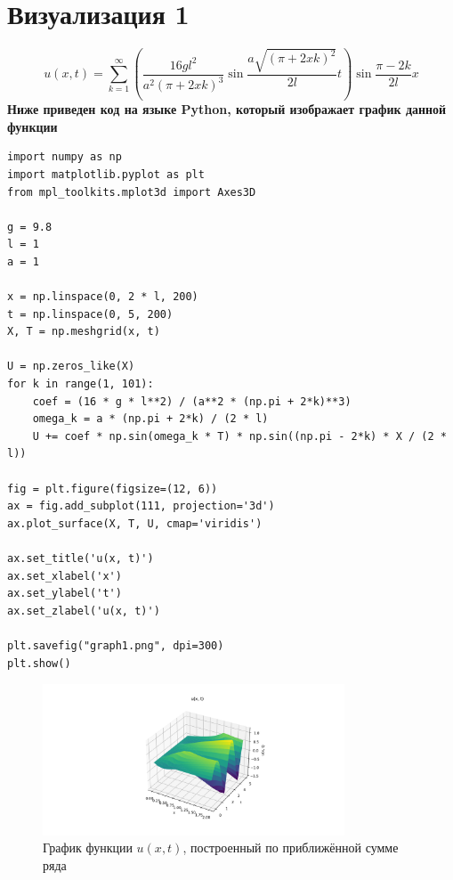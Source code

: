 \documentclass[a4paper,12pt]{article}
\begin{document}
\section{Визуализация 1}
$$u(x,t) = \sum_{k=1}^\infty \left( \frac{16 g l^2}{a^2 (\pi + 2 x k)^3} \sin \frac{a \sqrt{(\pi + 2 x k)^2}}{2 l} t \right) \sin \frac{\pi - 2 k}{2 l} x$$
\textbf{Ниже приведен код на языке Python, который изображает график данной функции}
\begin{lstlisting}
import numpy as np
import matplotlib.pyplot as plt
from mpl_toolkits.mplot3d import Axes3D

g = 9.8
l = 1
a = 1

x = np.linspace(0, 2 * l, 200)
t = np.linspace(0, 5, 200)
X, T = np.meshgrid(x, t)

U = np.zeros_like(X)
for k in range(1, 101):
    coef = (16 * g * l**2) / (a**2 * (np.pi + 2*k)**3)
    omega_k = a * (np.pi + 2*k) / (2 * l)
    U += coef * np.sin(omega_k * T) * np.sin((np.pi - 2*k) * X / (2 * l))

fig = plt.figure(figsize=(12, 6))
ax = fig.add_subplot(111, projection='3d')
ax.plot_surface(X, T, U, cmap='viridis')

ax.set_title('u(x, t)')
ax.set_xlabel('x')
ax.set_ylabel('t')
ax.set_zlabel('u(x, t)')

plt.savefig("graph1.png", dpi=300)
plt.show()

\end{lstlisting}
\begin{figure}[H]
    \centering
    \includegraphics[width=0.8\textwidth]{../graph1.png}
    \caption{График функции $u(x,t)$, построенный по приближённой сумме ряда}

\end{figure}
\end{document}
